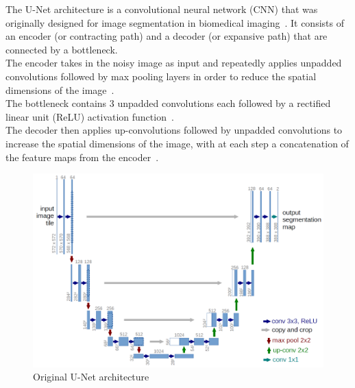 \documentclass[twoside]{article}
\numberwithin{equation}{section}
\numberwithin{figure}{section}
\begin{document}
The U-Net architecture is a convolutional neural network (CNN) that was originally designed for image segmentation in biomedical imaging~\cite{ronneberger2015unet}. It consists of an encoder (or contracting path) and a decoder (or expansive path) that are connected by a bottleneck. \\
The encoder takes in the noisy image as input and repeatedly applies unpadded convolutions followed by max pooling layers in order to reduce the spatial dimensions of the image~\cite{ronneberger2015unet}. \\
The bottleneck contains 3 unpadded convolutions each followed by a rectified linear unit (ReLU) activation function~\cite{ronneberger2015unet}. \\
The decoder then applies up-convolutions followed by unpadded convolutions to increase the spatial dimensions of the image, with at each step a concatenation of the feature maps from the encoder~\cite{ronneberger2015unet}.
\begin{figure}[h]
  \includegraphics[width=\textwidth]{images/unet.png}
  \caption{Original U-Net architecture~\cite{ronneberger2015unet}}
\end{figure}
\end{document}
